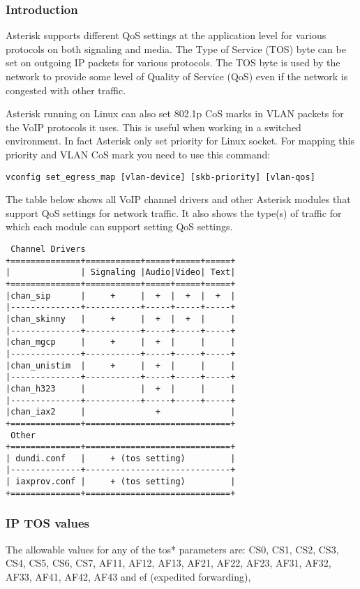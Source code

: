 \subsubsection{Introduction}

Asterisk supports different QoS settings at the application level for various
protocols on both signaling and media. The Type of Service (TOS) byte can be
set on outgoing IP packets for various protocols. The TOS byte is used by the
network to provide some level of Quality of Service (QoS) even if the network
is congested with other traffic.

Asterisk running on Linux can also set 802.1p CoS marks in VLAN packets for the 
VoIP protocols it uses. This is useful when working in a switched environment.
In fact Asterisk only set priority for Linux socket. For mapping this priority
and VLAN CoS mark you need to use this command:

\begin{verbatim}
vconfig set_egress_map [vlan-device] [skb-priority] [vlan-qos]
\end{verbatim}

The table below shows all VoIP channel drivers and other Asterisk modules that
support QoS settings for network traffic. It also shows the type(s) of
traffic for which each module can support setting QoS settings.

\begin{verbatim}
 Channel Drivers
+==============+===========+=====+=====+=====+
|              | Signaling |Audio|Video| Text|
+==============+===========+=====+=====+=====+
|chan_sip      |     +     |  +  |  +  |  +  |
|--------------+-----------+-----+-----+-----+
|chan_skinny   |     +     |  +  |  +  |     |
|--------------+-----------+-----+-----+-----+
|chan_mgcp     |     +     |  +  |     |     |
|--------------+-----------+-----+-----+-----+
|chan_unistim  |     +     |  +  |     |     |
|--------------+-----------+-----+-----+-----+
|chan_h323     |           |  +  |     |     |
|--------------+-----------+-----+-----+-----+
|chan_iax2     |              +              |
+==============+=============================+
 Other
+==============+=============================+
| dundi.conf   |     + (tos setting)         |
|--------------+-----------------------------+
| iaxprov.conf |     + (tos setting)         |
+==============+=============================+
\end{verbatim}


\subsubsection{IP TOS values}
The allowable values for any of the tos* parameters are: 
CS0, CS1, CS2, CS3, CS4, CS5, CS6, CS7, AF11, AF12, AF13, AF21, AF22, AF23, 
AF31, AF32, AF33, AF41, AF42, AF43 and ef (expedited forwarding),

